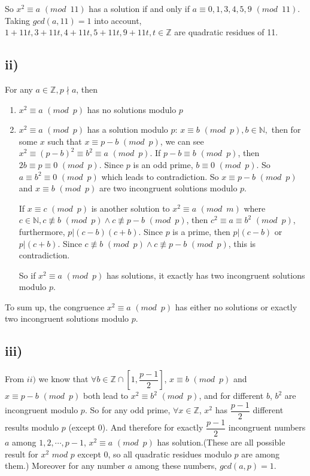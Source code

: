 \documentclass[a4paper,12pt,titlepage]{article}
\begin{document}
So $x^2\equiv a\,\,(mod\,\,\,11)$ has a solution if and only if $a\equiv0,1,3,4,5,9\,\,(mod\,\,\,11)$. Taking $gcd(a,11)=1$ into account,  $1+11t,3+11t,4+11t,5+11t,9+11t,t\in\mathbb{Z}$ are quadratic residues of 11.


\subsection*{ii)}
For any $a\in\mathbb{Z},p\nmid a$, then 
\begin{enumerate}
\item $x^2\equiv a\,\,(mod\,\,\,p)$ has no solutions modulo $p$
\item $x^2\equiv a\,\,(mod\,\,\,p)$ has a solution modulo $p$: $x\equiv b\,\,(mod\,\,\,p),b\in\mathbb{N}, $ then for some $x$ such that $x\equiv p-b\,\,(mod\,\,\,p)$, we can see $x^2\equiv (p-b)^2\equiv b^2\equiv a\,\,(mod\,\,\,p)$. If $p-b\equiv b\,\,(mod\,\,\,p)$, then $2b\equiv p\equiv 0\,\,(mod\,\,\,p)$. Since $p$ is an odd prime, $b\equiv 0\,\,(mod\,\,\,p)$. So $a\equiv b^2\equiv 0\,\,(mod\,\,\,p)$ which leads to contradiction. So $x\equiv p-b\,\,(mod\,\,\,p)$ and   $x\equiv b\,\,(mod\,\,\,p)$ are two incongruent solutions modulo $p$.

If $x\equiv c\,\,(mod\,\,\,p)$ is another solution to $x^2\equiv a\,\,(mod\,\,\,m)$ where $c\in \mathbb{N}, c\not \equiv b\,\,(mod\,\,\,p)\wedge c\not \equiv p-b\,\,(mod\,\,\,p)$, then $c^2\equiv a\equiv b^2\,\,(mod\,\,\,p)$, furthermore, $p|(c-b)(c+b)$. Since $p$ is a prime, then $p|(c-b)$ or $p|(c+b)$. Since $c\not \equiv b\,\,(mod\,\,\,p)\wedge c\not \equiv p-b\,\,(mod\,\,\,p)$, this is contradiction. 

So if $x^2\equiv a\,\,(mod\,\,\,p)$ has solutions, it exactly has two incongruent solutions modulo $p$.
\end{enumerate}

To sum up, the congruence $x^2\equiv a\,\,(mod\,\,\,p)$ has either no solutions or exactly two incongruent solutions modulo $p$.

\subsection*{iii)}
From $ii)$ we know that $\forall b\in\mathbb{Z}\cap[1,\dfrac{p-1}{2}]$, $x\equiv b\,\,(mod\,\,\,p)$ and $x\equiv p-b\,\,(mod\,\,\,p)$ both lead to $x^2\equiv b^2\,\,(mod\,\,\,p)$, and for different $b$, $b^2$ are incongruent modulo $p$. So for any odd prime, $\forall x\in\mathbb{Z}$, $x^2$ has  $\dfrac{p-1}{2}$ different results modulo $p$ (except 0). And therefore for exactly $\dfrac{p-1}{2}$ incongruent numbers $a$ among $1,2,\cdots,p-1$, $x^2\equiv a\,\,(mod\,\,\,p)$ has solution.(These are all possible result for $x^2\,\,mod\,\,p$ except 0, so all quadratic residues modulo $p$ are among them.) Moreover for any number $a$ among these numbers, $gcd(a,p)=1$.
\end{document}
